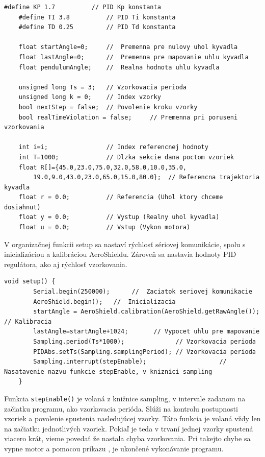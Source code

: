 \begin{lstlisting}[caption={Načítanie knižníc a premenných do programu.},captionpos=b]
	#define KP 1.7          // PID Kp konstanta
	#define TI 3.8          // PID Ti konstanta
	#define TD 0.25         // PID Td konstanta
	
	float startAngle=0;     //  Premenna pre nulovy uhol kyvadla
	float lastAngle=0;      //  Premenna pre mapovanie uhlu kyvadla
	float pendulumAngle;    //  Realna hodnota uhlu kyvadla
	
	unsigned long Ts = 3;   // Vzorkovacia perioda 
	unsigned long k = 0;    // Index vzorky 
	bool nextStep = false;  // Povolenie kroku vzorky 
	bool realTimeViolation = false;     // Premenna pri poruseni vzorkovania
	
	int i=i;                // Index referencnej hodnoty 
	int T=1000;             // Dlzka sekcie dana poctom vzoriek 
	float R[]={45.0,23.0,75.0,32.0,58.0,10.0,35.0,
		19.0,9.0,43.0,23.0,65.0,15.0,80.0};  // Referencna trajektoria kyvadla
	float r = 0.0;          // Referencia (Uhol ktory chceme dosiahnut)
	float y = 0.0;          // Vystup (Realny uhol kyvadla)
	float u = 0.0;          // Vstup (Vykon motora)
\end{lstlisting}

V organizačnej funkcii setup sa nastaví rýchlosť sériovej komunikácie, spolu s inicializáciou a kalibráciou AeroShieldu. Zároveň sa nastavia hodnoty PID 
regulátora, ako aj rýchlosť vzorkovania.  

\begin{lstlisting}[caption={Organzačná funkcia setup.},captionpos=b]
	void setup() {   
		Serial.begin(250000);      //  Zaciatok seriovej komunikacie
		AeroShield.begin();   //  Inicializacia 
		startAngle = AeroShield.calibration(AeroShield.getRawAngle());        // Kalibracia
		lastAngle=startAngle+1024;       // Vypocet uhlu pre mapovanie 
		Sampling.period(Ts*1000);              // Vzorkovacia perioda 
		PIDAbs.setTs(Sampling.samplingPeriod); // Vzorkovacia perioda
		Sampling.interrupt(stepEnable);  				   // Nasatavenie nazvu funkcie stepEnable, v kniznici sampling 
	}
\end{lstlisting}

Funkcia \verb|stepEnable()| je volaná z knižnice sampling, v intervale zadanom na začiatku programu, ako vzorkovacia perióda. Slúži na kontrolu postupnosti vzoriek a povolenie spustenia nasledujúcej vzorky. Táto funkcia je volaná vždy len na začiatku jednotlivých vzoriek. Pokiaľ je teda v trvaní jednej vzorky spustená viacero krát, vieme povedať že nastala chyba vzorkovania. Pri takejto chybe sa vypne motor a pomocou príkazu , je ukončené vykonávanie programu. 

